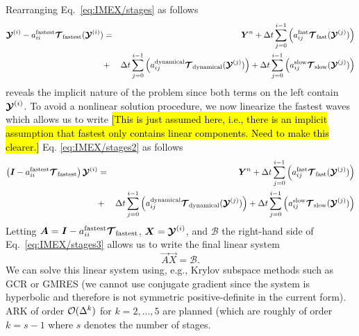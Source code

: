 \documentclass{article}
\begin{document}
Rearranging Eq.\ \eqref{eq:IMEX/stages} as follows
\begin{eqnarray}
\boldsymbol{{\mathcal{Y}}}^{(i)} - {a}^{\mathrm{fastest}}_{ii} \boldsymbol{{\mathcal{T}}}_{\mathrm{fastest}}(\boldsymbol{{\mathcal{Y}}}^{(i)}) & = & \boldsymbol{{Y}}^n + 
\Delta t \sum_{j=0}^{i-1} \left( {a}^{\mathrm{fast}}_{ij} \boldsymbol{{\mathcal{T}}}_{\mathrm{fast}}(\boldsymbol{{\mathcal{Y}}}^{(j)}) \right)  \label{eq:IMEX/stages2} \\
&+&  \Delta t \sum_{j=0}^{i-1} \left( {a}^{\mathrm{dynamical}}_{ij} \boldsymbol{{\mathcal{T}}}_{\mathrm{dynamical}}(\boldsymbol{{\mathcal{Y}}}^{(j)}) \right) + \Delta t \sum_{j=0}^{i-1} \left( {a}^{\mathrm{slow}}_{ij} \boldsymbol{{\mathcal{T}}}_{\mathrm{slow}}(\boldsymbol{{\mathcal{Y}}}^{(j)}) \right) 
\nonumber 
\end{eqnarray}
reveals the implicit nature of the problem since both terms on the left contain $\boldsymbol{{\mathcal{Y}}}^{(i)}$. To avoid a nonlinear solution procedure, we now linearize the fastest waves which allows us to write \hl{[This is just assumed here, i.e., there is an implicit assumption that fastest only contains linear components. Need to make this clearer.]} Eq. \eqref{eq:IMEX/stages2} as follows
\begin{eqnarray}
\left( \boldsymbol{{I}} - {a}^{\mathrm{fastest}}_{ii} \boldsymbol{{\mathcal{T}}}_{\mathrm{fastest}} \right) \boldsymbol{{\mathcal{Y}}}^{(i)} & = & \boldsymbol{{Y}}^n + 
\Delta t \sum_{j=0}^{i-1} \left( {a}^{\mathrm{fast}}_{ij} \boldsymbol{{\mathcal{T}}}_{\mathrm{fast}}(\boldsymbol{{\mathcal{Y}}}^{(j)}) \right) 
\\
&+&  \Delta t \sum_{j=0}^{i-1} \left( {a}^{\mathrm{dynamical}}_{ij} \boldsymbol{{\mathcal{T}}}_{\mathrm{dynamical}}(\boldsymbol{{\mathcal{Y}}}^{(j)}) \right) + \Delta t \sum_{j=0}^{i-1} \left( {a}^{\mathrm{slow}}_{ij} \boldsymbol{{\mathcal{T}}}_{\mathrm{slow}}(\boldsymbol{{\mathcal{Y}}}^{(j)}) \right) \nonumber
\label{eq:IMEX/stages3}
\end{eqnarray}
Letting $\boldsymbol{{A}}=\boldsymbol{{I}} - {a}^{\mathrm{fastest}}_{ii} \boldsymbol{{\mathcal{T}}}_{\mathrm{fastest}}$, $\boldsymbol{{X}}=\boldsymbol{{\mathcal{Y}}}^{(i)}$, and $\mathcal{B}$ the right-hand side of Eq.\ \eqref{eq:IMEX/stages3} allows us to write the final linear system 
\[
\vec{A} \vec{X} = \mathcal{B}.
\]
We can solve this linear system using, e.g., Krylov subspace methods such as GCR or GMRES (we cannot use conjugate gradient since the system is hyperbolic and therefore is not symmetric positive-definite in the current form). ARK of order $\mathcal{O}(\Delta ^k)$ for $k=2,\ldots,5$ are planned (which are roughly of order $k=s-1$ where $s$ denotes the number of stages.
\end{document}
